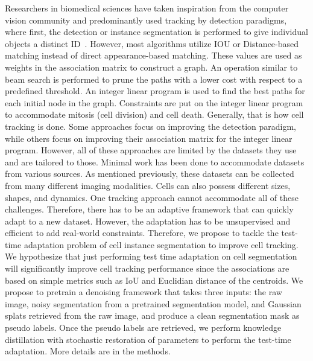 Researchers in biomedical sciences have taken inspiration from the computer vision community and predominantly used tracking by detection paradigms, where first, the detection or instance segmentation is performed to give individual objects a distinct ID~\cite{bragantini2024ultrack,ershov2022trackmate}. However, most algorithms utilize IOU or Distance-based matching instead of direct appearance-based matching. These values are used as weights in the association matrix to construct a graph. An operation similar to beam search is performed to prune the paths with a lower cost with respect to a predefined threshold.  An integer linear program is used to find the best paths for each initial node in the graph. Constraints are put on the integer linear program to accommodate mitosis (cell division) and cell death. Generally, that is how cell tracking is done. Some approaches focus on improving the detection paradigm, while others focus on improving their association matrix for the integer linear program. However, all of these approaches are limited by the datasets they use and are tailored to those. Minimal work has been done to accommodate datasets from various sources. As mentioned previously, these datasets can be collected from many different imaging modalities. Cells can also possess different sizes, shapes, and dynamics. One tracking approach cannot accommodate all of these challenges. Therefore, there has to be an adaptive framework that can quickly adapt to a new dataset. However, the adaptation has to be unsupervised and efficient to add real-world constraints. Therefore, we propose to tackle the test-time adaptation problem of cell instance segmentation to improve cell tracking.\\

We hypothesize that just performing test time adaptation on cell segmentation will significantly improve cell tracking performance since the associations are based on simple metrics such as IoU and Euclidian distance of the centroids. We propose to pretrain a denoising framework that takes three inputs: the raw image, noisy segmentation from a pretrained segmentation model, and Gaussian splats retrieved from the raw image, and produce a clean segmentation mask as pseudo labels. Once the pseudo labels are retrieved, we perform knowledge distillation with stochastic restoration of parameters to perform the test-time adaptation. More details are in the methods.   
